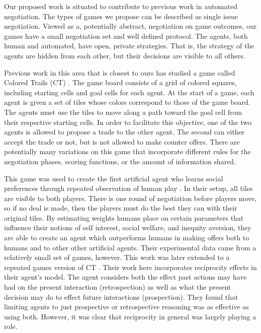 \documentclass[12pt]{article}
\begin{document}
Our proposed work is situated to contribute to previous work in automated negotiation. The types of games we propose can be described as single issue negotiation. Viewed as a, potentially abstract, negotiation on game outcomes, our games have a small negotiation set and well defined protocol. The agents, both human and automated, have open, private strategies. That is, the strategy of the agents are hidden from each other, but their decisions are visible to all others. 

Previous work in this area that is closest to ours has studied a game called Colored Trails (CT) \cite{Grosz:2004kt}. The game board consists of a grid of colored squares, including starting cells and goal cells for each agent. At the start of a game, each agent is given a set of tiles whose colors correspond to those of the game board. The agents must use the tiles to move along a path toward the goal cell from their respective starting cells. In order to facilitate this objective, one of the two agents is allowed to propose a trade to the other agent. The second can either accept the trade or not, but is not allowed to make counter offers. There are potentially many variations on this game that incorporate different rules for the negotiation phases, scoring functions, or the amount of information shared.

This game was used to create the first artificial agent who learns social preferences through repeated observation of human play \cite{Gal:2004ua}. In their setup, all tiles are visible to both players. There is one round of negotiation before players move, so if no deal is made, then the players must do the best they can with their original tiles. By estimating weights humans place on certain parameters that influence their notions of self interest, social welfare, and inequity aversion, they are able to create an agent which outperforms humans in making offers both to humans and to other other artificial agents. Their experimental data came from a relatively small set of games, however. This work was later extended to a repeated games version of CT \cite{Gal:2007tl}. Their work here incorporates reciprocity effects in their agent's model. The agent considers both the effect past actions may have had on the present interaction (retrospection) as well as what the present decision may do to effect future interactions (prospection). They found that limiting agents to just prospective or retrospective reasoning was as effective as using both. However, it was clear that reciprocity in general was largely playing a role.
\end{document}
